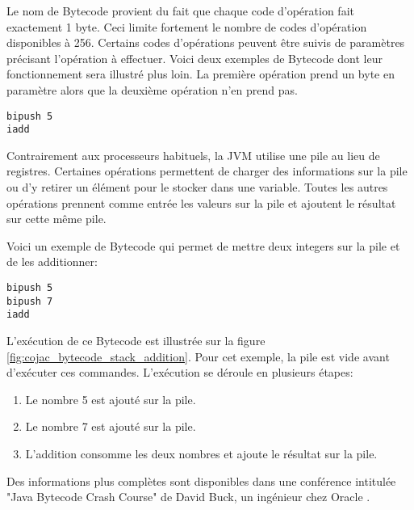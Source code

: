 Le nom de Bytecode provient du fait que chaque code d'opération fait exactement 1 byte. Ceci limite fortement le nombre de codes d'opération disponibles à 256. Certains codes d'opérations peuvent être suivis de paramètres précisant l'opération à effectuer. Voici deux exemples de Bytecode dont leur fonctionnement sera illustré plus loin. La première opération prend un byte en paramètre alors que la deuxième opération n'en prend pas.
\begin{verbatim}
bipush 5
iadd
\end{verbatim}

Contrairement aux processeurs habituels, la JVM utilise une pile au lieu de registres. Certaines opérations permettent de charger des informations sur la pile ou d'y retirer un élément pour le stocker dans une variable. Toutes les autres opérations prennent comme entrée les valeurs sur la pile et ajoutent le résultat sur cette même pile.

Voici un exemple de Bytecode qui permet de mettre deux integers sur la pile et de les additionner:
\begin{verbatim}
bipush 5
bipush 7
iadd
\end{verbatim}

\begin{minipage2}
L'exécution de ce Bytecode est illustrée sur la figure \ref{fig:cojac_bytecode_stack_addition}. Pour cet exemple, la pile est vide avant d'exécuter ces commandes. L'exécution se déroule en plusieurs étapes:
\begin{enumerate}
    \item Le nombre 5 est ajouté sur la pile.
    \item Le nombre 7 est ajouté sur la pile.
    \item L'addition consomme les deux nombres et ajoute le résultat sur la pile.
\end{enumerate}
\end{minipage2}

\begin{minipage}{\linewidth}%
\label{fig:cojac_bytecode_stack_addition}
\end{minipage}

Des informations plus complètes sont disponibles dans une conférence intitulée "Java Bytecode Crash Course" de David Buck, un ingénieur chez Oracle \cite{java-bytecode-video}.

